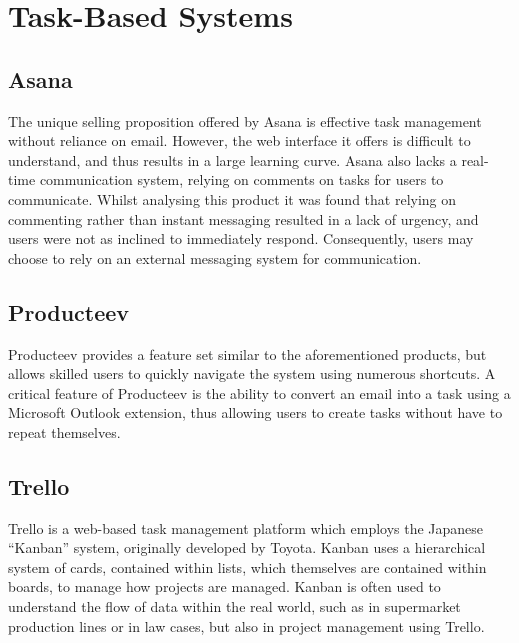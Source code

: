\documentclass[a4paper]{l3proj}
\begin{document}
\section{Task-Based Systems}
\subsection{Asana}
\label{asana}

The unique selling proposition offered by Asana \cite{site:asana} is effective task management without reliance on email. However, the web interface it offers is difficult to understand, and thus results in a large learning curve. Asana also lacks a real-time communication system, relying on comments on tasks for users to communicate. Whilst analysing this product it was found that relying on commenting rather than instant messaging resulted in a lack of urgency, and users were not as inclined to immediately respond. Consequently, users may choose to rely on an external messaging system for communication.

\subsection{Producteev}
\label{producteev}

Producteev \cite{site:producteev} provides a feature set similar to the aforementioned products, but allows skilled users to quickly navigate the system using numerous shortcuts. A critical feature of Producteev is the ability to convert an email into a task using a Microsoft Outlook extension, thus allowing users to create tasks without have to repeat themselves. 

\subsection{Trello}
\label{trello}

Trello \cite{site:trello} is a web-based task management platform which employs the Japanese ``Kanban''
system, originally developed by Toyota. Kanban uses a hierarchical system of
cards, contained within lists, which themselves are contained within boards, to
manage how projects are managed. Kanban is often used to understand the flow of data within the real world, such as in supermarket production lines or in law cases, but also in project management using Trello.
\end{document}
